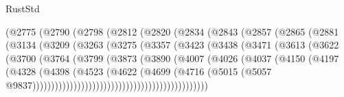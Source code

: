 \begin{lexlean}{RustStd}
\begin{coremodule}
                      (@2775
                        (@2790
                          (@2798
                            (@2812
                              (@2820
                                (@2834
                                  (@2843
                                    (@2857
                                      (@2865
                                        (@2881
                                          (@3134
                                            (@3209
                                              (@3263
                                                (@3275
                                                  (@3357
                                                    (@3423
                                                      (@3438
                                                        (@3471
                                                          (@3613
                                                            (@3622
                                                              (@3700
                                                                (@3764
                                                                  (@3799
                                                                    (@3873
                                                                      (@3890
                                                                        (@4007
                                                                          (@4026
                                                                            (@4037
                                                                              (@4150
                                                                                (@4197
                                                                                  (@4328
                                                                                    (@4398
                                                                                      (@4523
                                                                                        (@4622
                                                                                          (@4699
                                                                                            (@4716
                                                                                              (@5015
                                                                                                (@5057
                                                                                                  @9837)))))))))))))))))))))))))))))))))))))))))))))))

\end{coremodule}
\end{lexlean}
